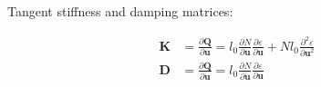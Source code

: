 Tangent stiffness and damping matrices:

\begin{align}
\boldsymbol{K} &= \frac{\partial \boldsymbol{Q}}{\partial \boldsymbol{u}} = l_{0}\frac{\partial N}{\partial \boldsymbol{u}}\frac{\partial \varepsilon}{\partial \boldsymbol{u}} + Nl_{0}\frac{\partial^2 \varepsilon}{\partial \boldsymbol{u}^2} \\
\boldsymbol{D} &= \frac{\partial \boldsymbol{Q}}{\partial \dot{\boldsymbol{u}}} = l_{0}\frac{\partial N}{\partial \dot{\boldsymbol{u}}}\frac{\partial \varepsilon}{\partial \boldsymbol{u}}
\end{align}



\newpage





